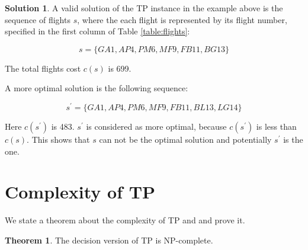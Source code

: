 \documentclass{article}
\theoremstyle{definition}
\newtheorem{theorem}{Theorem}
\newtheorem*{solution}{Solution}
\begin{document}
\begin{solution}
A valid solution of the TP instance in the example above is the sequence of flights $s$, where the each flight is represented by its flight number, specified in the first column of Table \ref{table:flights}:

$$ s = \{GA1, AP4, PM6, MF9, FB11, BG13\} $$

The total flights cost $c(s)$ is 699.

\end{solution}

A more optimal solution is the following sequence:

$$ s^{\prime} = \{GA1, AP4, PM6, MF9, FB11, BL13, LG14\} $$

Here $c(s^{\prime})$ is 483. $s^{\prime}$ is considered as more optimal, because $c(s^{\prime})$ is less than $c(s)$. This shows that $s$ can not be the optimal solution and potentially $s^{\prime}$ is the one.


\section{Complexity of TP}

We state a theorem about the complexity of TP and and prove it.

\begin{theorem}
The decision version of TP is NP-complete.
\end{theorem}
\end{document}
